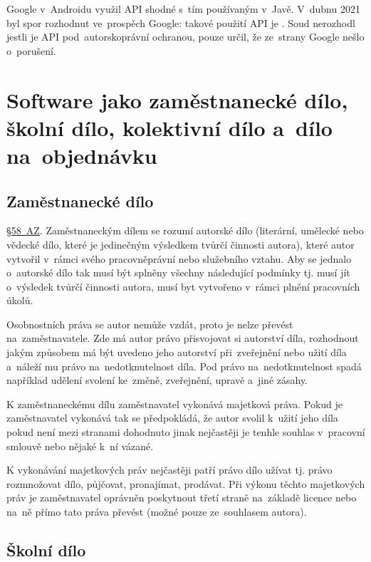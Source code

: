 Google v~Androidu využil API shodné s~tím používaným v~Javě. V~dubnu 2021 byl spor rozhodnut ve~prospěch Google: takové použití API je . Soud nerozhodl jestli je API pod~autorskoprávní ochranou, pouze určil, že ze~strany Google nešlo o~porušení.

\clearpage
\section{Software jako zaměstnanecké dílo, školní dílo, kolektivní dílo a~dílo na~objednávku}

\subsection{Zaměstnanecké dílo}

\href{https://www.zakonyprolidi.cz/cs/2000-121#p58}{§58~AZ}. Zaměstnaneckým dílem se rozumí autorské dílo (literární, umělecké nebo vědecké dílo, které je jedinečným výsledkem tvůrčí činnosti autora), které autor vytvořil v~rámci svého pracovněprávní nebo služebního vztahu. Aby se jednalo o~autorské dílo tak musí být splněny všechny následující podmínky tj. musí jít o~výsledek tvůrčí činnosti autora, musí byt vytvořeno v~rámci plnění pracovních úkolů.

Osobnostních práva se autor nemůže vzdát, proto je nelze převést na~zaměstnavatele. Zde má autor právo přisvojovat si autorství díla, rozhodnout jakým způsobem má být uvedeno jeho autorství při~zveřejnění nebo užití díla a~náleží mu právo na~nedotknutelnost díla. Pod právo na~nedotknutelnost spadá například udělení svolení ke~změně, zveřejnění, upravě a~jiné zásahy.

K zaměstnaneckému dílu zaměstnavatel vykonává majetková práva. Pokud je zaměstnavatel vykonává tak se předpokládá, že autor svolil k~užití jeho díla pokud není mezi stranami dohodnuto jinak nejčastěji je tenhle souhlas v~pracovní smlouvě nebo nějaké k~ní vázané.

K vykonávání majetkových práv nejčastěji patří právo dílo užívat tj. právo rozmnožovat dílo, půjčovat, pronajímat, prodávat. Při výkonu těchto majetkových práv je zaměstnavatel oprávněn poskytnout třetí straně na~základě licence nebo na~ně přímo tato práva převést (možné pouze ze~souhlasem autora).

\subsection{Školní dílo}

